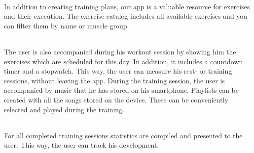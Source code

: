 \documentclass[FIPLY_base.tex]{subfiles}
\begin{document}
\ \\
In addition to creating training plans, our app is a valuable resource for exercises and their execution.
The exercise catalog includes all available exercises and you can filter them by name or muscle group.

\ \\
The user is also accompanied during his workout session by showing him the exercises which are scheduled for this day. In addition, it includes a countdown timer and a stopwatch. This way, the user can measure his rest- or training sessions, without leaving the app.
During the training session, the user is accompanied by music that he has stored on his smartphone.
Playlists can be created with all the songs stored on the device. These can be conveniently selected and played during the training.

\ \\
For all completed training sessions statistics are compiled and presented to the user.
This way, the user can track his development.
\end{document}

